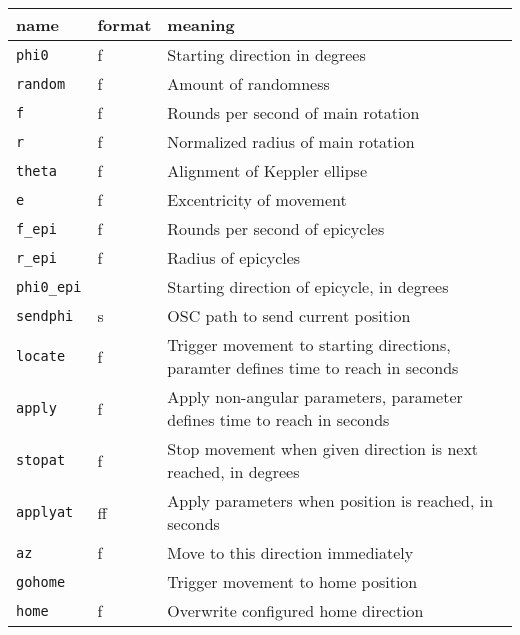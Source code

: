 \begin{tabularx}{\textwidth}{llX}
  {\bf name }     & {\bf format} & {\bf meaning}                                                                      \\
  \hline
  {\tt phi0}      & f            & Starting direction in degrees                                                      \\
  {\tt random}    & f            & Amount of randomness                                                               \\
  {\tt f}         & f            & Rounds per second of main rotation                                                 \\
  {\tt r}         & f            & Normalized radius of main rotation                                                 \\
  {\tt theta}     & f            & Alignment of Keppler ellipse                                                       \\
  {\tt e}         & f            & Excentricity of movement                                                           \\
  {\tt f\_epi}    & f            & Rounds per second of epicycles                                                     \\
  {\tt r\_epi}    & f            & Radius of epicycles                                                                \\
  {\tt phi0\_epi} &              & Starting direction of epicycle, in degrees                                         \\
  {\tt sendphi}   & s            & OSC path to send current position                                                  \\
  {\tt locate}    & f            & Trigger movement to starting directions, paramter defines time to reach in seconds \\
  {\tt apply}     & f            & Apply non-angular parameters, parameter defines time to reach in seconds           \\
  {\tt stopat}    & f            & Stop movement when given direction is next reached, in degrees                     \\
  {\tt applyat}   & ff           & Apply parameters when position is reached, in seconds                              \\
  {\tt az}        & f            & Move to this direction immediately                                                 \\
  {\tt gohome}    &              & Trigger movement to home position                                                  \\
  {\tt home}      & f            & Overwrite configured home direction                                                \\
\end{tabularx}
